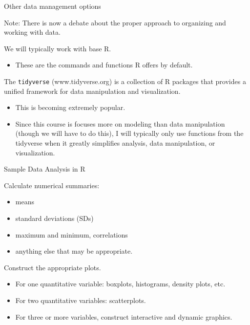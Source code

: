 \begin{frame}[fragile]{Other data management options}
\protect\hypertarget{other-data-management-options}{}

Note: There is now a debate about the proper approach to organizing and
working with data.

We will typically work with base R.

\begin{itemize}
\tightlist
\item
  These are the commands and functions R offers by default.
\end{itemize}

The \texttt{tidyverse} (www.tidyverse.org) is a collection of R packages
that provides a unified framework for data manipulation and
visualization.

\begin{itemize}
\tightlist
\item
  This is becoming extremely popular.
\item
  Since this course is focuses more on modeling than data manipulation
  (though we will have to do this), I will typically only use functions
  from the tidyverse when it greatly simplifies analysis, data
  manipulation, or visualization.
\end{itemize}

\end{frame}

\begin{frame}{Sample Data Analysis in R}
\protect\hypertarget{sample-data-analysis-in-r}{}

Calculate numerical summaries:

\begin{itemize}
\tightlist
\item
  means
\item
  standard deviations (SDs)
\item
  maximum and minimum, correlations
\item
  anything else that may be appropriate.
\end{itemize}

Construct the appropriate plots.

\begin{itemize}
\tightlist
\item
  For one quantitative variable: boxplots, histograms, density plots,
  etc.
\item
  For two quantitative variables: scatterplots.
\item
  For three or more variables, construct interactive and dynamic
  graphics.
\end{itemize}

\end{frame}

